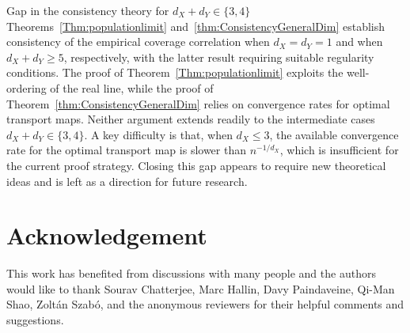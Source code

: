 \documentclass[11pt]{article}
\begin{document}
\begin{paragraph}{Gap in the consistency theory for $d_X + d_Y\in\{3,4\}$}
Theorems~\ref{Thm:populationlimit} and~\ref{thm:ConsistencyGeneralDim}
establish consistency of the empirical coverage correlation when
$d_X=d_Y=1$ and when $d_X+d_Y\geq 5$, respectively, with the latter result
requiring suitable regularity conditions. The proof of
Theorem~\ref{Thm:populationlimit} exploits the well-ordering of the real
line, while the proof of Theorem~\ref{thm:ConsistencyGeneralDim} relies on
convergence rates for optimal transport maps. Neither argument extends
readily to the intermediate cases $d_X+d_Y\in\{3,4\}$. A key difficulty is
that, when $d_X\leq 3$, the available convergence rate for the optimal
transport map is slower than $n^{-1/d_X}$, which is insufficient for the
current proof strategy. Closing this gap appears to require new theoretical
ideas and is left as a direction for future research.
\end{paragraph}


\section*{Acknowledgement}
This work has benefited from discussions with many people and the authors would
like to thank Sourav Chatterjee, Marc Hallin, Davy Paindaveine, Qi-Man Shao, Zolt\'an Szab\'o, and the anonymous reviewers for their helpful comments and suggestions.


\end{document}
